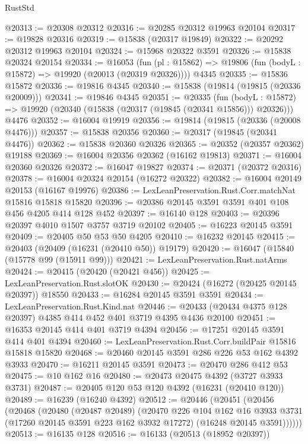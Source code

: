 \begin{lexlean}{RustStd}
\begin{coremodule}
@20313 := @20308 @20312
@20316 := @20285 @20312 @19963 @20104
@20317 := @19828 @20316
@20319 := @15838 (@20317 @19849)
@20322 := @20292 @20312 @19963 @20104
@20324 := @15968 @20322 @3591
@20326 := @15838 @20324 @20154
@20334 := @16053
    (fun (pl : @15862) => @19806 (fun (bodyL : @15872) => @19920 (@20013 (@20319 @20326))))
    @4345
@20335 := @15836 @15872
@20336 := @19816 @4345
@20340 := @15838 (@19814 (@19815 (@20336 @20009)))
@20341 := @19846 @4345
@20351 := @20335
    (fun (bodyL : @15872) => @19920 (@20340 (@15838 (@20317 (@19845 (@20341 @15856))) @20326)))
    @4476
@20352 := @16004 @19919
@20356 := @19814 (@19815 (@20336 (@20008 @4476)))
@20357 := @15838 @20356
@20360 := @20317 (@19845 (@20341 @4476))
@20362 := @15838 @20360 @20326
@20365 := @20352 (@20357 @20362) @19188
@20369 := @16004 @20356 @20362 (@16162 @19813)
@20371 := @16004 @20360 @20326
@20372 := @16047 @19827
@20374 := @20371 (@20372 @20316)
@20378 := @16004 @20324 @20154 (@16272 @20322)
@20382 := @16004 @20149 @20153 (@16167 @19976)
@20386 := LexLeanPreservation.Rust.Corr.matchNat @15816 @15818 @15820
@20396 := @20386 @20145 @3591 @3591 @401 @108 @456 @4205 @414 @128 @452
@20397 := @16140 @128
@20403 := @20396 @20397 @4010 @1507 @3757 @3719 @20102
@20405 := @16223 @20145 @3591
@20409 := @20405 @50 @53 @50 @4205
@20410 := @16232 @20145
@20415 := @20403 (@20409 (@16231 (@20410 @50)) @19179)
@20420 := @16047 (@15840 (@15778 @99 (@15911 @99)))
@20421 := LexLeanPreservation.Rust.natArms
@20424 := @20415 (@20420 (@20421 @456))
@20425 := LexLeanPreservation.Rust.slotOK
@20430 := @20424 (@16272 (@20425 @20145 @20397)) @18550
@20433 := @16284 @20145 @3591 @3591
@20434 := LexLeanPreservation.Rust.Kind.nat
@20446 := @20433 (@20434 @4375 @128 @20397) @4385 @414 @452 @401 @3719 @4395 @4436 @20100
@20451 := @16353 @20145 @414 @401 @3719 @4394
@20456 := @17251 @20145 @3591 @414 @401 @4394
@20460 := LexLeanPreservation.Rust.Corr.buildPair @15816 @15818 @15820
@20468 := @20460 @20145 @3591 @286 @226 @53 @162 @4392 @3933
@20470 := @16211 @20145 @3591
@20473 := @20470 @286 @412 @53
@20475 := @10 @162 @16
@20480 := @20473 @20475 @4392 (@3727 @3933 @3731)
@20487 := @20405 @120 @53 @120 @4392 (@16231 (@20410 @120))
@20489 := @16239 (@16240 @4392)
@20512 := @20446
    (@20451
      (@20456
        (@20468
          (@20480
            (@20487 @20489)
            (@20470
              @226
              @104
              @162
              @16
              @3933
              @3731
              (@17260 @20145 @3591 @223 @162 @3932 @17272)
              (@16248 @20145 @3591))))))
@20513 := @16135 @128
@20516 := @16133 (@20513 (@18952 @20397))

\end{coremodule}
\end{lexlean}
